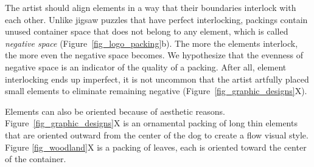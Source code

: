 The artist should align elements in a way that their boundaries interlock with each other.
Unlike jigsaw puzzles that have perfect interlocking, 
packings contain unused container space that does not belong to any element,
which is called \textit{negative space} (Figure~\ref{fig_logo_packing}b).
The more the elements interlock, the more even the negative space becomes.
We hypothesize that the evenness of negative space is an indicator of the quality of a packing.
After all, element interlocking ends up imperfect, it is not uncommon that 
the artist artfully placed small elements
to eliminate remaining negative (Figure~\ref{fig_graphic_designs}X).


Elements can also be oriented because of aesthetic reasons.
Figure~\ref{fig_graphic_designs}X is an ornamental packing
of long thin elements that are oriented outward from the center of the dog to create a flow visual style.
Figure \ref{fig_woodland}X is a packing of leaves, each is oriented toward the center of the container.

